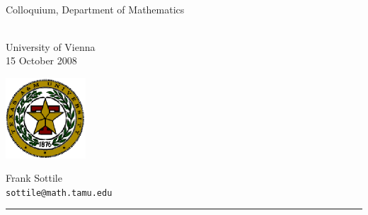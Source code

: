 \documentclass[17pt,landscape]{Narrow}
\begin{document}
\sf

\slide{}
\LogoOff
\thispagestyle{empty}

\begin{center}\rule{0pt}{30pt}
\rule{0pt}{25pt}\\
\large Colloquium, Department of Mathematics\rule{0pt}{30pt}\\
University of Vienna\\
15 October 2008\vspace{-30pt}


\hfill{}\vspace{-115pt}

\noindent\hspace{-10pt}
\includegraphics[width=3cm]{tamuseal.eps}
\begin{minipage}[b]{8cm}
Frank Sottile\\
{\small\tt sottile@math.tamu.edu}
\end{minipage}\rule{100pt}{0pt}


\end{center}

\end{document}
